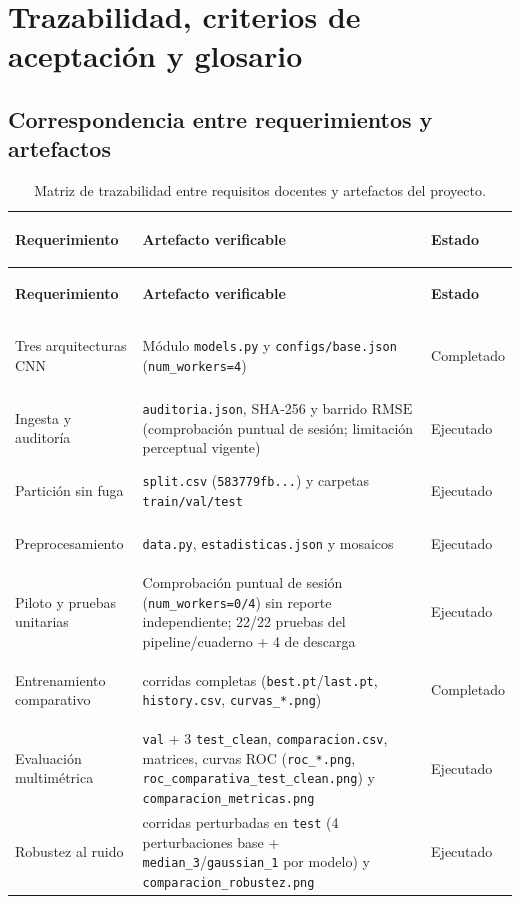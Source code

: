 \FloatBarrier\section{Trazabilidad, criterios de aceptación y glosario}

\subsection{Correspondencia entre requerimientos y artefactos}
{\small\setlength{\tabcolsep}{6pt}\renewcommand{\arraystretch}{1.1}
\begin{longtable}{@{}>{\bfseries\raggedright\arraybackslash}p{4.2cm}>{\raggedright\arraybackslash}p{8.0cm}>{\raggedright\arraybackslash}p{3.4cm}@{}}
\caption{Matriz de trazabilidad entre requisitos docentes y artefactos del proyecto.}\\
\toprule
\textbf{Requerimiento} & \textbf{Artefacto verificable} & \textbf{Estado} \\ \midrule\endfirsthead
\toprule
\textbf{Requerimiento} & \textbf{Artefacto verificable} & \textbf{Estado} \\ \midrule\endhead
Tres arquitecturas CNN & Módulo \texttt{models.py} y \texttt{configs/base.json} (\texttt{num\_workers=4}) & Completado \\
Ingesta y auditoría & \texttt{auditoria.json}, SHA-256 y barrido $\mathrm{RMSE}$ (comprobación puntual de sesión; limitación perceptual vigente) & Ejecutado \\
Partición sin fuga & \texttt{split.csv} (\texttt{583779fb...}) y carpetas \texttt{train/val/test} & Ejecutado \\
Preprocesamiento & \texttt{data.py}, \texttt{estadisticas.json} y mosaicos & Ejecutado \\
Piloto y pruebas unitarias & Comprobación puntual de sesión (\texttt{num\_workers=0/4}) sin reporte independiente; 22/22 pruebas del pipeline/cuaderno + 4 de descarga & Ejecutado \\
Entrenamiento comparativo & 3 corridas completas (\texttt{best.pt}/\texttt{last.pt}, \texttt{history.csv}, \texttt{curvas\_*.png}) & Completado \\
Evaluación multimétrica & 3 \texttt{val} + 3 \texttt{test\_clean}, \texttt{comparacion.csv}, matrices, curvas ROC (\texttt{roc\_*.png}, \texttt{roc\_comparativa\_test\_clean.png}) y \texttt{comparacion\_metricas.png} & Ejecutado \\
Robustez al ruido & 18 corridas perturbadas en \texttt{test} (4 perturbaciones base + \texttt{median\_3}/\texttt{gaussian\_1} por modelo) y \texttt{comparacion\_robustez.png} & Ejecutado \\

\end{longtable}}
